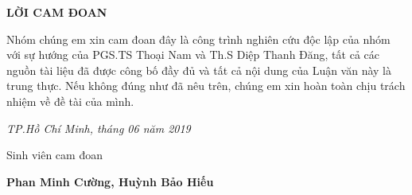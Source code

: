 \centerline{\bf \large\MakeUppercase{Lời cam đoan}}

\vspace{20pt}

Nhóm chúng em xin cam đoan đây là công trình nghiên cứu độc lập của nhóm với sự hướng của PGS.TS Thoại Nam và Th.S Diệp Thanh Đăng, tất cả các nguồn tài liệu đã được công bố đầy đủ và tất cả nội dung của Luận văn này là trung thực. Nếu không đúng như đã nêu trên, chúng em xin hoàn toàn chịu trách nhiệm về đề tài của mình.

\begin{flushright}
	{\it TP.Hồ Chí Minh, tháng 06 năm 2019}
	
	Sinh viên cam đoan \hskip 2cm\quad
	
	\vskip 1cm
	{\bf Phan Minh Cường, Huỳnh Bảo Hiếu} \quad\ 
\end{flushright}
